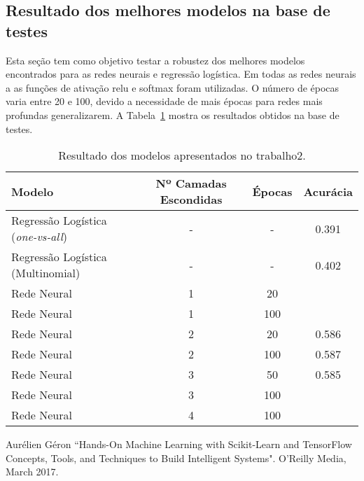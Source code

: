 \documentclass[conference]{IEEEtran}
\begin{document}
\subsection{Resultado dos melhores modelos na base de testes}

Esta seção tem como objetivo testar a robustez dos melhores modelos encontrados para as redes neurais e regressão logística. Em todas as redes neurais a as funções de ativação relu e softmax foram utilizadas. O número de épocas varia entre 20 e 100, devido a necessidade de mais épocas para redes mais profundas generalizarem. A Tabela~\ref{tab:result} mostra os resultados obtidos na base de testes.

\begin{table}[h!]
	\centering
	
	\begin{tabular}{lccc} \toprule
		\textbf{Modelo} & \textbf{Nº Camadas Escondidas} & \textbf{Épocas} & \textbf{Acurácia}    \\ \toprule 	
		Regressão Logística (\emph{one-vs-all}) & - & - & 0.391 \\
		Regressão Logística (Multinomial) & - & - & 0.402 \\  \toprule 
	    Rede Neural & 1 & 20  &  \\
   	    Rede Neural & 1 & 100 &  \\
	    Rede Neural & 2 & 20  & 0.586 \\
	    Rede Neural & 2 & 100 & 0.587 \\
	    Rede Neural & 3 & 50  & 0.585 \\
	    Rede Neural & 3 & 100 &  \\
   	    Rede Neural & 4 & 100 &  \\
	    
		
	
		\bottomrule      
	\end{tabular}
	\caption{Resultado dos modelos apresentados no trabalho2.}
	\label{tab:result}
\end{table}

\begin{thebibliography}{00}
 Aurélien Géron ``Hands-On Machine Learning with Scikit-Learn and TensorFlow
Concepts, Tools, and Techniques to Build Intelligent Systems". O'Reilly Media, March 2017.
\end{thebibliography}
\end{document}
